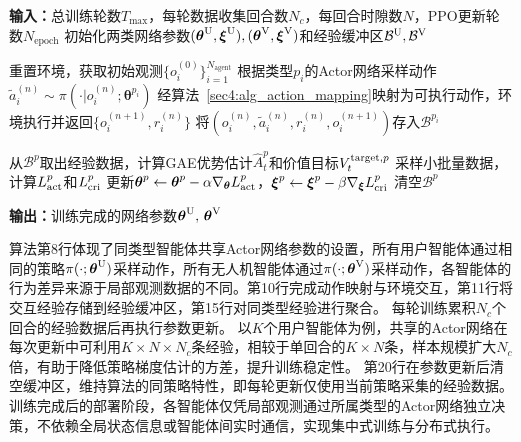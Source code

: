 \begin{algorithm}[!ht]
\caption{异构多智能体MAPPO训练算法}
\label{sec4:alg_mappo}
\begin{algorithmic}[1]

\STATE \textbf{输入：}总训练轮数$T_{\max}$，每轮数据收集回合数$N_c$，每回合时隙数$N$，PPO更新轮数$N_{\text{epoch}}$
\STATE 初始化两类网络参数$(\boldsymbol{\theta}^{\rm U}, \boldsymbol{\xi}^{\rm U}),(\boldsymbol{\theta}^{\rm V}, \boldsymbol{\xi}^{\rm V})$和经验缓冲区$\mathcal{B}^{\rm U}, \mathcal{B}^{\rm V}$

        \STATE 重置环境，获取初始观测$\{o_i^{(0)}\}_{i=1}^{N_{\text{agent}}}$
                \STATE 根据类型$p_i$的Actor网络采样动作$\tilde{a}_i^{(n)} \sim \pi(\cdot | o_i^{(n)};\boldsymbol{\theta}^{p_i})$
            \ENDFOR
            \STATE 经算法~\ref{sec4:alg_action_mapping}映射为可执行动作，环境执行并返回$\{o_i^{(n+1)}, r_i^{(n)}\}$
            \STATE 将$(o_i^{(n)}, \tilde{a}_i^{(n)}, r_i^{(n)}, o_i^{(n+1)})$存入$\mathcal{B}^{p_i}$
        \ENDFOR
    \ENDFOR

        \STATE 从$\mathcal{B}^p$取出经验数据，计算GAE优势估计$\hat{A}_t^p$和价值目标$V_t^{{\rm target},p}$
            \STATE 采样小批量数据，计算$L_{\rm act}^p$和$L_{\rm cri}^p$
            \STATE 更新$\boldsymbol{\theta}^p \leftarrow \boldsymbol{\theta}^p - \alpha \nabla_{\boldsymbol{\theta}} L_{\rm act}^p$，$\boldsymbol{\xi}^p \leftarrow \boldsymbol{\xi}^p - \beta \nabla_{\boldsymbol{\xi}} L_{\rm cri}^p$
        \ENDFOR
        \STATE 清空$\mathcal{B}^p$
    \ENDFOR
\ENDFOR

\STATE \textbf{输出：}训练完成的网络参数$\boldsymbol{\theta}^{\rm U},\, \boldsymbol{\theta}^{\rm V}$

\end{algorithmic}
\end{algorithm}

算法第8行体现了同类型智能体共享Actor网络参数的设置，所有用户智能体通过相同的策略$\pi(\cdot;\boldsymbol{\theta}^{\rm U})$采样动作，所有无人机智能体通过$\pi(\cdot;\boldsymbol{\theta}^{\rm V})$采样动作，各智能体的行为差异来源于局部观测数据的不同。第10行完成动作映射与环境交互，第11行将交互经验存储到经验缓冲区，第15行对同类型经验进行聚合。
每轮训练累积$N_c$个回合的经验数据后再执行参数更新。
以$K$个用户智能体为例，共享的Actor网络在每次更新中可利用$K \times N \times N_c$条经验，相较于单回合的$K \times N$条，样本规模扩大$N_c$倍，有助于降低策略梯度估计的方差，提升训练稳定性。
第20行在参数更新后清空缓冲区，维持算法的同策略特性，即每轮更新仅使用当前策略采集的经验数据。
训练完成后的部署阶段，各智能体仅凭局部观测通过所属类型的Actor网络独立决策，不依赖全局状态信息或智能体间实时通信，实现集中式训练与分布式执行。

